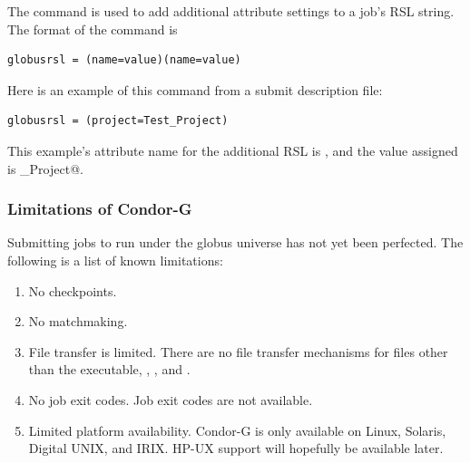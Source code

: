 The  command is used to add additional
attribute settings to a job's RSL string.
The format of the  command is
\begin{verbatim}
globusrsl = (name=value)(name=value)
\end{verbatim}
Here is an example of this command from a submit description file:
\begin{verbatim}
globusrsl = (project=Test_Project)
\end{verbatim}
This example's attribute name for the additional RSL is
\verb@project@, and the value assigned is \verb@Test_Project@.

\subsubsection{\label{sec:Condor-G-Limits}Limitations of Condor-G}
Submitting jobs to run under the globus universe has not yet
been perfected.
The following is a list of known limitations:

\begin{enumerate}
\item{No checkpoints.}
\item{No matchmaking.}
\item{File transfer is limited.}
There are no file transfer mechanisms for files other
than the executable, , , and .
\item{No job exit codes.}
Job exit codes are not available.
\item{Limited platform availability.}
Condor-G is only available on Linux, Solaris,
Digital UNIX, and IRIX.
HP-UX support will hopefully be available later.
\end{enumerate}
